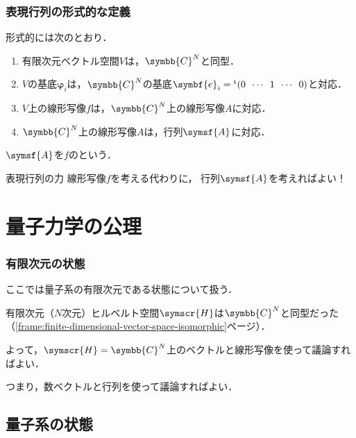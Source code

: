 \documentclass[
    10pt,
    ]{sotsu-beamer}
\begin{document}
\begin{frame}
    \frametitle{表現行列の形式的な定義}

    形式的には次のとおり．
    \begin{enumerate}
        \item 有限次元ベクトル空間$V$は，$\symbb{C}^N$と同型．
        \item $V$の基底$\symbf{\varphi}_i$は，$\symbb{C}^N$の基底$\symbf{e}_i = \cvector{0 ; \cdots ; 1 ; \cdots ; 0}$と対応．
        \item $V$上の線形写像$f$は，$\symbb{C}^N$上の線形写像$A$に対応．
        \item $\symbb{C}^N$上の線形写像$A$は，行列$\symsf{A}$に対応．
    \end{enumerate}
    $\symsf{A}$を$f$のという．

    \pause

    \begin{alertblock}{表現行列の力}
        線形写像$f$を考える代わりに，
        行列$\symsf{A}$を考えればよい！
    \end{alertblock}

\end{frame}




\section{量子力学の公理}


\begin{frame}
    \frametitle{有限次元の状態}

    ここでは量子系の\alert{有限次元である状態}について扱う．

    有限次元（$N$次元）ヒルベルト空間$\symscr{H}$は$\symbb{C}^N$と同型だった（\ref{frame:finite-dimensional-vector-space-isomorphic}ページ）．
    
    よって，$\symscr{H} = \symbb{C}^N$上のベクトルと線形写像を使って議論すればよい．

    つまり，\alert{数ベクトルと行列}を使って議論すればよい．

\end{frame}


\subsection{量子系の状態}
\end{document}
